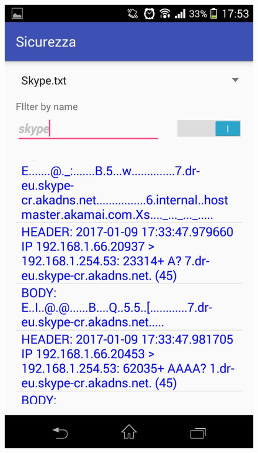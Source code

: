 \documentclass[12pt]{article} %
\begin{document}
\begin{figure}[htbp]
{\includegraphics[scale=0.2]{./skype.jpeg}}
\\
%

\end{figure}
\end{document}
